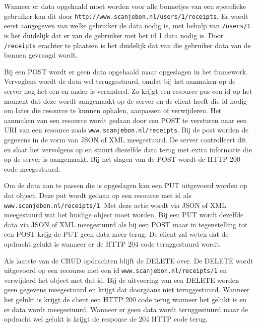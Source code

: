 \documentclass[a4paper,11pt,oneside]{report}
\begin{document}
Wanneer er data opgehaald moet worden voor alle bonnetjes van een specefieke gebruiker kan dit door \colorbox{code-block}{\lstinline[style=code-block]|http://www.scanjebon.nl/users/1/receipts|}. Er wordt eerst aangegeven van welke gebruiker de data nodig is, met behulp van \colorbox{code-block}{\lstinline[style=code-block]|/users/1|} is het duidelijk dat er van de gebruiker met het id 1 data nodig is. Door \colorbox{code-block}{\lstinline[style=code-block]|/receipts|} erachter te plaatsen is het duidelijk dat van die gebruiker data van de bonnen gevraagd wordt.

Bij een POST wordt er geen data opgehaald maar opgeslagen in het framework. Vervoglens wordt de data wel teruggestuurd, omdat bij het aanmaken op de server nog het een en ander is veranderd. Zo krijgt een resource pas een id op het moment dat deze wordt aangemaakt op de server en de client heeft die id nodig om later die resource te kunnen ophalen, aanpassen of verwijderen. Het aanmaken van een resource wordt gedaan door een POST te versturen naar een URI van een resource zoals \colorbox{code-block}{\lstinline[style=code-block]|www.scanjebon.nl/receipts|}. Bij de post worden de gegevens in de vorm van JSON of XML meegestuurd. De server controlleert dit en slaat het vervolgens op en stuurt diezelfde data terug met extra informatie die op de server is aangemaakt. Bij het slagen van de POST wordt de HTTP 200 code meegestuurd.

Om de data aan te passen die is opgeslagen kan een PUT uitgevoerd worden op dat object. Deze put wordt gedaan op een resource met id als \colorbox{code-block}{\lstinline[style=code-block]|www.scanjebon.nl/receipts/1|}. Met deze actie wordt via JSON of XML meegestuurd wat het huidige object moet worden. Bij een PUT wordt dezelfde data via JSON of XML meegestuurd als bij een POST maar in tegenstelling tot een POST krijg de PUT geen data meer terug. De client zal weten dat de opdracht gelukt is wanneer er de HTTP 204 code teruggestuurd wordt.

Als laatste van de CRUD opdrachten blijft de DELETE over. De DELETE wordt uitgevoerd op een recourse met een id \colorbox{code-block}{\lstinline[style=code-block]|www.scanjebon.nl/receipts/1|} en verwijderd het object met dat id. Bij de uitvoering van een DELETE worden geen gegevens meegestuurd en krijgt dat doorgaans niet teruggestuurd. Wanneer het gelukt is krijgt de client een HTTP 200 code terug wanneer het gelukt is en er data wordt meegestuurd. Wanneer er geen data wordt teruggestuurd maar de opdracht wel gelukt is krijgt de response de 204 HTTP code terug. 
\end{document}
